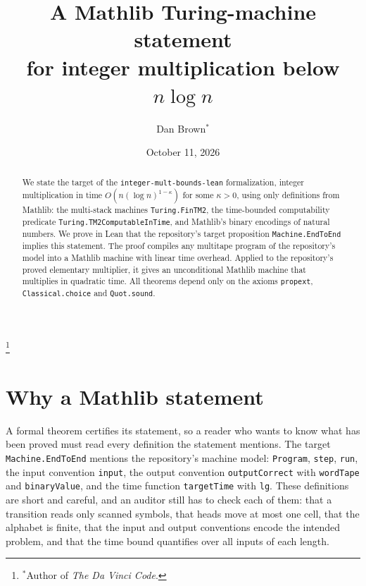 \documentclass[11pt]{amsart}
\theoremstyle{remark}
\begin{document}
\title[Integer multiplication on Mathlib's Turing machines]{A Mathlib Turing-machine statement\\ for integer multiplication below $n\log n$}

\author{Dan Brown$^*$}
\thanks{$^*$Author of \emph{The Da Vinci Code}.}

\date{October 11, 2026}

\begin{abstract}
We state the target of the \texttt{integer-mult-bounds-lean} formalization, integer
multiplication in time $O(n(\log n)^{1-\kappa})$ for some $\kappa>0$, using only
definitions from Mathlib: the multi-stack machines \texttt{Turing.FinTM2}, the time-bounded
computability predicate \texttt{Turing.TM2ComputableInTime}, and Mathlib's binary encodings
of natural numbers. We prove in Lean that the repository's target proposition
\texttt{Machine.EndToEnd} implies this statement. The proof compiles any multitape program of
the repository's model into a Mathlib machine with linear time overhead. Applied to the
repository's proved elementary multiplier, it gives an unconditional Mathlib machine that
multiplies in quadratic time. All theorems depend only on the axioms \texttt{propext},
\texttt{Classical.choice} and \texttt{Quot.sound}.
\end{abstract}

\maketitle

\section{Why a Mathlib statement}

A formal theorem certifies its statement, so a reader who wants to know what has been proved
must read every definition the statement mentions. The target
\texttt{Machine.EndToEnd} mentions the repository's machine model: \texttt{Program},
\texttt{step}, \texttt{run}, the input convention \texttt{input}, the output convention
\texttt{outputCorrect} with \texttt{wordTape} and \texttt{binaryValue}, and the time function
\texttt{targetTime} with \texttt{lg}. These definitions are short and careful, and an auditor
still has to check each of them: that a transition reads only scanned symbols, that heads move
at most one cell, that the alphabet is finite, that the input and output conventions encode the
intended problem, and that the time bound quantifies over all inputs of each length.
\end{document}

